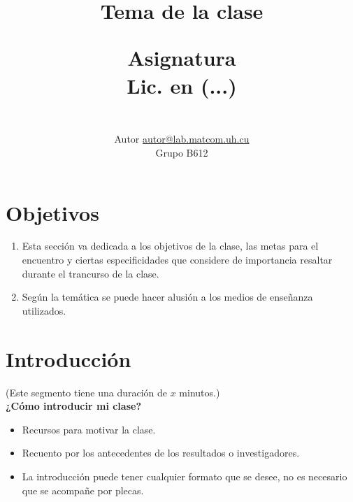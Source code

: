 \documentclass[a4paper,10pt,twocolumn]{article}
\title{Tema de la clase\\
\vspace{2ex}
\begin{large}
Asignatura\\
Lic. en (...)
\end{large}}
\author{\\
\name Autor \email \href{mailto:a.uno@lab.matcom.uh.cu}{autor@lab.matcom.uh.cu}
	\\ \addr Grupo B612}
\theoremstyle{theorem}
\theoremstyle{definition}
\theoremstyle{remark}
\begin{document}

\section{Objetivos}
\begin{enumerate}
	\item Esta sección va dedicada a los objetivos de la clase, las metas para el encuentro y ciertas especificidades que considere de importancia resaltar durante el trancurso de la clase.
	\item Según la temática se puede hacer alusión a los medios de enseñanza utilizados.
\end{enumerate}


\section{Introducción}\label{sec:intro}
(Este segmento tiene una duración de $x$ minutos.)\\

\textbf{¿Cómo introducir mi clase?}
		\begin{itemize}
			\item Recursos para motivar la clase.
			\item Recuento por los antecedentes de los resultados o investigadores.
			\item La introducción puede tener cualquier formato que se desee, no es necesario que se acompañe por plecas.
		\end{itemize}
\end{document}
